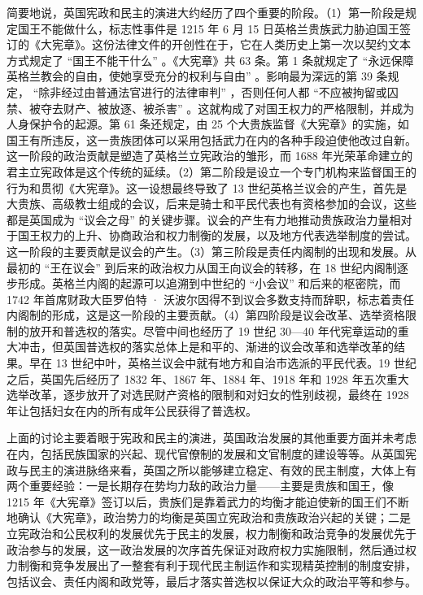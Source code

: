 简要地说，英国宪政和民主的演进大约经历了四个重要的阶段。（1）第一阶段是规定国王不能做什么，标志性事件是 1215 年 6 月 15 日英格兰贵族武力胁迫国王签订的《大宪章》。这份法律文件的开创性在于，它在人类历史上第一次以契约文本方式规定了 “国王不能干什么” 。《大宪章》共 63 条。第 1 条就规定了 “永远保障英格兰教会的自由，使她享受充分的权利与自由” 。影响最为深远的第 39 条规定， “除非经过由普通法官进行的法律审判” ，否则任何人都 “不应被拘留或囚禁、被夺去财产、被放逐、被杀害” 。这就构成了对国王权力的严格限制，并成为人身保护令的起源。第 61 条还规定，由 25 个大贵族监督《大宪章》的实施，如国王有所违反，这一贵族团体可以采用包括武力在内的各种手段迫使他改过自新。这一阶段的政治贡献是塑造了英格兰立宪政治的雏形，而 1688 年光荣革命建立的君主立宪政体是这个传统的延续。（2）第二阶段是设立一个专门机构来监督国王的行为和贯彻《大宪章》。这一设想最终导致了 13 世纪英格兰议会的产生，首先是大贵族、高级教士组成的会议，后来是骑士和平民代表也有资格参加的会议，这些都是英国成为 “议会之母” 的关键步骤。议会的产生有力地推动贵族政治力量相对于国王权力的上升、协商政治和权力制衡的发展，以及地方代表选举制度的尝试。这一阶段的主要贡献是议会的产生。（3）第三阶段是责任内阁制的出现和发展。从最初的 “王在议会” 到后来的政治权力从国王向议会的转移，在 18 世纪内阁制逐步形成。英格兰内阁的起源可以追溯到中世纪的 “小会议” 和后来的枢密院，而 1742 年首席财政大臣罗伯特 · 沃波尔因得不到议会多数支持而辞职，标志着责任内阁制的形成，这是这一阶段的主要贡献。（4）第四阶段是议会改革、选举资格限制的放开和普选权的落实。尽管中间也经历了 19 世纪 30—40 年代宪章运动的重大冲击，但英国普选权的落实总体上是和平的、渐进的议会改革和选举改革的结果。早在 13 世纪中叶，英格兰议会中就有地方和自治市选派的平民代表。19 世纪之后，英国先后经历了 1832 年、1867 年、1884 年、1918 年和 1928 年五次重大选举改革，逐步放开了对选民财产资格的限制和对妇女的性别歧视，最终在 1928 年让包括妇女在内的所有成年公民获得了普选权。

上面的讨论主要着眼于宪政和民主的演进，英国政治发展的其他重要方面并未考虑在内，包括民族国家的兴起、现代官僚制的发展和文官制度的建设等等。从英国宪政与民主的演进脉络来看，英国之所以能够建立稳定、有效的民主制度，大体上有两个重要经验：一是长期存在势均力敌的政治力量——主要是贵族和国王，像 1215 年《大宪章》签订以后，贵族们是靠着武力的均衡才能迫使新的国王们不断地确认《大宪章》，政治势力的均衡是英国立宪政治和贵族政治兴起的关键；二是立宪政治和公民权利的发展优先于民主的发展，权力制衡和政治竞争的发展优先于政治参与的发展，这一政治发展的次序首先保证对政府权力实施限制，然后通过权力制衡和竞争发展出了一整套有利于现代民主制运作和实现精英控制的制度安排，包括议会、责任内阁和政党等，最后才落实普选权以保证大众的政治平等和参与。

